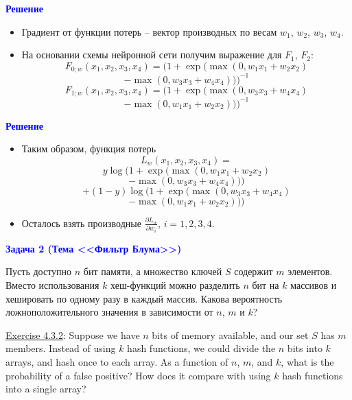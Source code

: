 \documentclass[landscape]{slides}
\begin{document}
\begin{slide}
\textbf{\textcolor{blue}{Решение}}

\begin{itemize}
\item Градиент от функции потерь -- вектор производных по весам $w_1$, $w_2$, $w_3$, $w_4$.
\item На основании схемы нейронной сети получим выражение для $F_1$, $F_2$:
$$ F_{0;w}(x_1,x_2,x_3,x_4) = 
(1+\exp(\max(0,w_1x_1+w_2x_2)$$
$$ - \max(0,w_3x_3+w_4x_4)))^{-1} $$
$$ F_{1;w}(x_1,x_2,x_3,x_4) = 
(1+\exp(\max(0,w_3x_3+w_4x_4) $$
$$- \max(0,w_1x_1+w_2x_2)))^{-1} $$
\end{itemize}

\end{slide}


\begin{slide}
\textbf{\textcolor{blue}{Решение}}

\begin{itemize}
\item Таким образом, функция потерь
$$ L_w(x_1,x_2,x_3,x_4) = $$
$$ y\log (1+\exp(\max(0,w_1x_1+w_2x_2)$$
$$- \max(0,w_3x_3+w_4x_4))) $$
$$ +(1-y)\log (1+\exp(\max(0,w_3x_3+w_4x_4)$$
$$- \max(0,w_1x_1+w_2x_2))) $$
\item Осталось взять производные $\frac{\partial L_w}{\partial w_i}$, $i=1,2,3,4$.
\end{itemize}

\end{slide}


\begin{slide}
\textbf{\textcolor{blue}{Задача 2 (Тема <<Фильтр Блума>>)}}

Пусть доступно $n$ бит памяти, а множество ключей $S$ содержит $m$ элементов. Вместо использования $k$
хеш-функций можно разделить $n$ бит на $k$ массивов и хешировать по одному разу в каждый массив. Какова вероятность ложноположительного значения в зависимости от $n$, $m$ и $k$?

\href{http://infolab.stanford.edu/~ullman/mmds/ch4.pdf}{Exercise 4.3.2}: Suppose we have $n$ bits of memory available, and our set $S$
has $m$ members. Instead of using $k$ hash functions, we could divide the $n$ bits
into $k$ arrays, and hash once to each array. As a function of $n$, $m$, and $k$, what
is the probability of a false positive? How does it compare with using $k$ hash
functions into a single array?

\end{slide}
\end{document}
